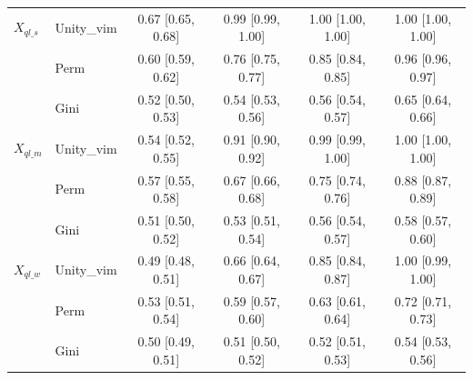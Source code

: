 \begin{tabular}{llcccc}
$X_{ql\_s}$ & Unity\_vim & 0.67 [0.65, 0.68] & 0.99 [0.99, 1.00] & 1.00 [1.00, 1.00] & 1.00 [1.00, 1.00]\\
 & Perm & 0.60 [0.59, 0.62] & 0.76 [0.75, 0.77] & 0.85 [0.84, 0.85] & 0.96 [0.96, 0.97]\\
 & Gini & 0.52 [0.50, 0.53] & 0.54 [0.53, 0.56] & 0.56 [0.54, 0.57] & 0.65 [0.64, 0.66]\\
$X_{ql\_m}$ & Unity\_vim & 0.54 [0.52, 0.55] & 0.91 [0.90, 0.92] & 0.99 [0.99, 1.00] & 1.00 [1.00, 1.00]\\
 & Perm & 0.57 [0.55, 0.58] & 0.67 [0.66, 0.68] & 0.75 [0.74, 0.76] & 0.88 [0.87, 0.89]\\
 & Gini & 0.51 [0.50, 0.52] & 0.53 [0.51, 0.54] & 0.56 [0.54, 0.57] & 0.58 [0.57, 0.60]\\
$X_{ql\_w}$ & Unity\_vim & 0.49 [0.48, 0.51] & 0.66 [0.64, 0.67] & 0.85 [0.84, 0.87] & 1.00 [0.99, 1.00]\\
 & Perm & 0.53 [0.51, 0.54] & 0.59 [0.57, 0.60] & 0.63 [0.61, 0.64] & 0.72 [0.71, 0.73]\\
 & Gini & 0.50 [0.49, 0.51] & 0.51 [0.50, 0.52] & 0.52 [0.51, 0.53] & 0.54 [0.53, 0.56]\\
\bottomrule
\end{tabular}
